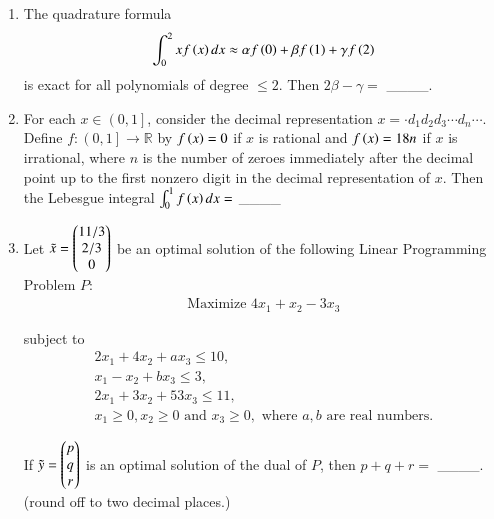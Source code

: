 \documentclass[journal]{IEEEtran}
\begin{document}
\begin{enumerate}
    \item The quadrature formula
        \begin{align*}
            \int_0^2 x f \left(x\right) dx \approx \alpha f \left(0\right) + \beta f \left(1\right) + \gamma f \left(2\right)
        \end{align*}
        is exact for all polynomials of degree $\leq 2$. Then $2\beta - \gamma =$ \_\_\_\_.

    \item For each $x \in\left( 0,1 \right]$, consider the decimal representation $x = \cdot d_1 d_2 d_3 \cdots d_n \cdots$. Define $f : \left( 0,1 \right] \rightarrow \mathbb{R}$ by $f\left(x\right) = 0$ if $x$ is rational and $f\left(x\right) = 18n$ if $x$ is irrational, where $n$ is the number of zeroes immediately after the decimal point up to the first nonzero digit in the decimal representation of $x$. Then the Lebesgue integral $\int_0^1 f \left(x\right) dx =$ \_\_\_\_

    \item \label{55} Let $\tilde{x} = \begin{pmatrix}11/3 \\ 2/3 \\ 0\end{pmatrix}$ be an optimal solution of the following Linear Programming Problem $P:$
        \begin{align*}
            \text{Maximize } 4x_1 + x_2 - 3x_3
        \end{align*}

        subject to
        \begin{align*}
            2x_1 + 4x_2 + a x_3 \leq 10,\\
            x_1 - x_2 + bx_3 \leq 3,\\
            2x_1 + 3x_2 + 53x_3 \leq 11,\\
            x_1 \geq 0, x_2 \geq 0 \text{ and } x_3 \geq 0, \text{ where } a,b \text{ are real numbers.}
        \end{align*}

        If $\tilde{y} = \begin{pmatrix}p\\q\\r\end{pmatrix}$ is an optimal solution of the dual of $P$, then $p+q+r=$ \_\_\_\_. (round off to two decimal places.)
\end{enumerate}



  
\end{document}
